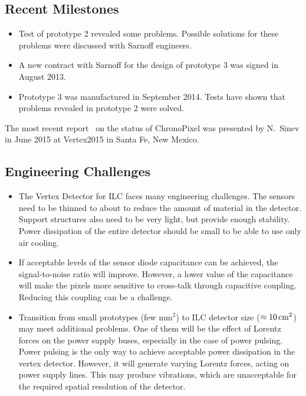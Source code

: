 \subsection{Recent Milestones}
\begin{itemize}
    \item Test of prototype 2 revealed some problems. Possible solutions for these problems were discussed with Sarnoff engineers.
    \item A new contract with Sarnoff for the design of prototype 3 was signed in August 2013.
    \item Prototype 3 was manufactured in September 2014. Tests have shown that problems revealed in prototype 2 were solved.
\end{itemize}
The most recent report~\cite{sinev:POS:Vertex2105} on the status of ChronoPixel was presented by N.~Sinev in June 2015 at Vertex2015 in Santa Fe, New Mexico.

\subsection{Engineering Challenges}
\begin{itemize}
    \item The Vertex Detector for ILC faces many engineering challenges. The sensors need to be thinned to about \unit[50]{\micron} to reduce the amount of material in the detector. Support structures also need to be very light, but provide enough stability. Power dissipation of the entire detector should be small to be able to use only air cooling.
    \item If acceptable levels of the sensor diode capacitance can be achieved, the signal-to-noise ratio will improve. However, a lower value of the capacitance will make the pixels more sensitive to cross-talk through capacitive coupling. Reducing this coupling can be a challenge.
    \item Transition from small prototypes (few $\text{mm}^{2}$) to ILC detector size ($\approx \unit[10]{cm^2}$) may meet additional problems. One of them will be the effect of Lorentz forces on the power supply buses, especially in the case of power pulsing. Power pulsing is the only way to achieve acceptable power dissipation in the vertex detector. However, it will generate varying Lorentz forces, acting on power supply lines. This may produce vibrations, which are unacceptable for the required spatial resolution of the detector.
\end{itemize}

